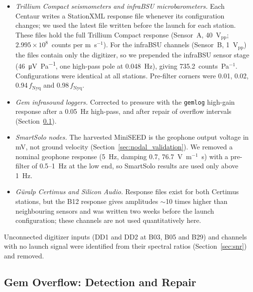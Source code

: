 \documentclass[]{seismica}
\begin{document}
\begin{itemize}
  \item \textit{Trillium Compact seismometers and infraBSU
    microbarometers.} Each Centaur writes a StationXML response file
    whenever its configuration changes; we used the latest file written
    before the launch for each station. These files hold the full
    Trillium Compact response (Sensor~A, 40~V$_\text{pp}$;
    $2.995\times10^{8}$~counts per m~s$^{-1}$). For the infraBSU
    channels (Sensor~B, 1~V$_\text{pp}$) the files contain only the
    digitizer, so we prepended the infraBSU sensor stage
    (\SI{46}{\micro\volt\per\pascal}, one high-pass pole at 0.048~Hz),
    giving 735.2~counts~Pa$^{-1}$. Configurations were identical at all
    stations. Pre-filter corners were 0.01, 0.02,
    0.94\,$f_\text{Nyq}$ and 0.98\,$f_\text{Nyq}$.
  \item \textit{Gem infrasound loggers.} Corrected to pressure with the
    \texttt{gemlog} high-gain response after a 0.05~Hz high-pass, and
    after repair of overflow intervals (Section~\ref{sec:overflow}).
  \item \textit{SmartSolo nodes.} The harvested MiniSEED is the
    geophone output voltage in mV, not ground velocity
    (Section~\ref{sec:nodal_validation}). We removed a nominal geophone
    response (5~Hz, damping 0.7, 76.7~V~m$^{-1}$~s) with a pre-filter
    of 0.5--1~Hz at the low end, so SmartSolo results are used only
    above 1~Hz.
  \item \textit{G\"{u}ralp Certimus and Silicon Audio.} Response files
    exist for both Certimus stations, but the B12 response gives
    amplitudes $\sim$10 times higher than neighbouring sensors and was
    written two weeks before the launch configuration; these channels
    are not used quantitatively here.
\end{itemize}

Unconnected digitizer inputs (DD1 and DD2 at B03, B05 and B29) and
channels with no launch signal were identified from their spectral
ratios (Section~\ref{sec:snr}) and removed.

\subsection{Gem Overflow: Detection and Repair}
\label{sec:overflow}
\end{document}

